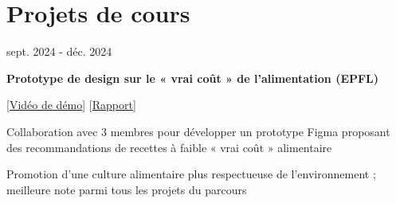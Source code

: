 \section{Projets de cours}


        \begin{twocolentry}{
            sept. 2024 - déc. 2024
        }

        \textbf{Prototype de design sur le « vrai coût » de l'alimentation (EPFL)}
        
        [\href{https://youtube.com/shorts/iSeM4460GBc?feature=share}{Vidéo de démo}] [\href{https://renyi.ch/reports/true-cost-of-food.pdf}{Rapport}]\end{twocolentry}
        \vspace{0.10 cm}
        \begin{onecolentry}
            \begin{highlights}
                \item Collaboration avec 3 membres pour développer un prototype Figma proposant des recommandations de recettes à faible « vrai coût » alimentaire
                \item Promotion d'une culture alimentaire plus respectueuse de l'environnement ; meilleure note parmi tous les projets du parcours
            \end{highlights}
        \end{onecolentry}

